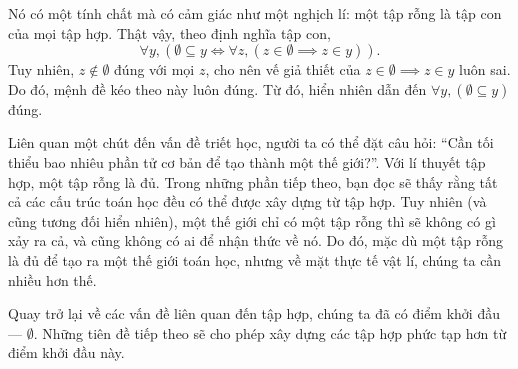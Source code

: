 Nó có một tính chất mà có cảm giác như một nghịch lí: một tập rỗng là tập con của mọi tập hợp. Thật vậy, theo định nghĩa tập con,
$$
\forall y, (\emptyset \subseteq y \iff \forall z, (z \in \emptyset \implies z \in y)).
$$
Tuy nhiên, $z \notin \emptyset$ đúng với mọi $z$, cho nên vế giả thiết của $z \in \emptyset \implies z \in y$ luôn sai. Do đó, mệnh đề kéo theo này luôn đúng. Từ đó, hiển nhiên dẫn đến $\forall y, (\emptyset \subseteq y)$ đúng.

Liên quan một chút đến vấn đề triết học, người ta có thể đặt câu hỏi: ``Cần tối thiểu bao nhiêu phần tử cơ bản để tạo thành một thế giới?''. Với lí thuyết tập hợp, một tập rỗng là đủ. Trong những phần tiếp theo, bạn đọc sẽ thấy rằng tất cả các cấu trúc toán học đều có thể được xây dựng từ tập hợp. Tuy nhiên (và cũng tương đối hiển nhiên), một thế giới chỉ có một tập rỗng thì sẽ không có gì xảy ra cả, và cũng không có ai để nhận thức về nó. Do đó, mặc dù một tập rỗng là đủ để tạo ra một thế giới toán học, nhưng về mặt thực tế vật lí, chúng ta cần nhiều hơn thế.

Quay trở lại về các vấn đề liên quan đến tập hợp, chúng ta đã có điểm khởi đầu --- $\emptyset$. Những tiên đề tiếp theo sẽ cho phép xây dựng các tập hợp phức tạp hơn từ điểm khởi đầu này.